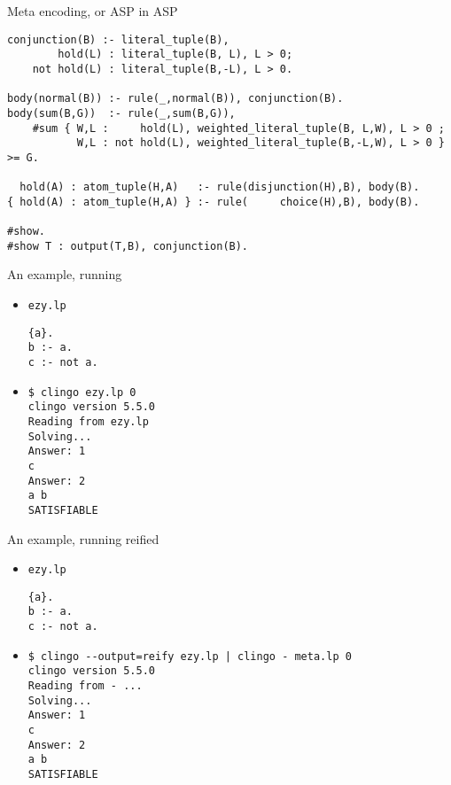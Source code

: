 \begin{frame}[fragile,shrink=34]{Meta encoding, or ASP in ASP}
\bigskip
\begin{lstlisting}
conjunction(B) :- literal_tuple(B),
        hold(L) : literal_tuple(B, L), L > 0;
    not hold(L) : literal_tuple(B,-L), L > 0.

body(normal(B)) :- rule(_,normal(B)), conjunction(B).
body(sum(B,G))  :- rule(_,sum(B,G)),
    #sum { W,L :     hold(L), weighted_literal_tuple(B, L,W), L > 0 ;
           W,L : not hold(L), weighted_literal_tuple(B,-L,W), L > 0 } >= G.

  hold(A) : atom_tuple(H,A)   :- rule(disjunction(H),B), body(B).
{ hold(A) : atom_tuple(H,A) } :- rule(     choice(H),B), body(B).

#show.
#show T : output(T,B), conjunction(B).
\end{lstlisting}
\end{frame}
\begin{frame}[fragile]{An example, running}
  \begin{itemize}
  \item {} \texttt{ezy.lp}
\begin{lstlisting}
{a}.
b :- a.
c :- not a.
\end{lstlisting}
  \item<2-> 
\begin{lstlisting}[basicstyle=\small\ttfamily]
$ clingo ezy.lp 0
clingo version 5.5.0
Reading from ezy.lp
Solving...
Answer: 1
c
Answer: 2
a b
SATISFIABLE
\end{lstlisting}
  \end{itemize}
\end{frame}
\begin{frame}[fragile]{An example, running reified}
  \begin{itemize}
  \item {} \texttt{ezy.lp}
\begin{lstlisting}
{a}.
b :- a.
c :- not a.
\end{lstlisting}
  \item<2-> 
\begin{lstlisting}[basicstyle=\small\ttfamily]
$ clingo --output=reify ezy.lp | clingo - meta.lp 0
clingo version 5.5.0
Reading from - ...
Solving...
Answer: 1
c
Answer: 2
a b
SATISFIABLE
\end{lstlisting}
  \end{itemize}
\end{frame}
